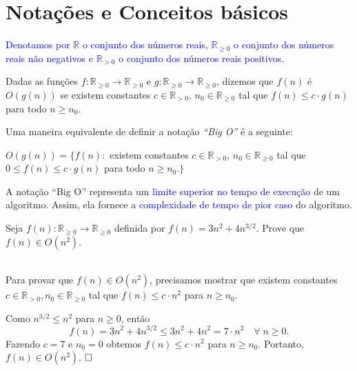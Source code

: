 \section{Notações e Conceitos básicos}
\textcolor{blue}{
Denotamos por
$\mathbb{R}$ o conjunto dos números reais, 
$\mathbb{R}_{\geq 0}$ o conjunto dos números reais não negativos e
$\mathbb{R}_{>0}$ o conjunto dos números reais positivos.
}
\begin{defn} 
Dadas as funções $f:\mathbb{R}_{\geq 0}\rightarrow \mathbb{R}_{\geq 0}$ e $g:\mathbb{R}_{\geq 0}\rightarrow \mathbb{R}_{\geq 0}$, dizemos que $f(n)$ é $O(g(n))$ se existem constantes $c\in\mathbb{R}_{>0}$, $n_0\in \mathbb{R}_{\geq 0}$ tal que $f(n) \leq c\cdot g(n)$  para todo $n \geq n_0$. 
\end{defn}
\vspace{0.2cm}

Uma maneira equivalente de definir a notação \textit{``Big O''} é a seguinte:\vspace{0.2cm}

\begin{defn}
$O(g(n)) = \{ f(n):$ existem constantes $c\in\mathbb{R}_{>0}$, $n_0\in \mathbb{R}_{\geq 0}$ tal que $0 \leq f(n) \leq c\cdot g(n)$ para todo $n \geq n_0.\}$
\end{defn}
\vspace{0.3cm}

A notação ``Big O'' representa um \textcolor{blue}{limite superior no tempo de execução} de um algoritmo.  Assim, ela fornece a \textcolor{blue}{complexidade de tempo de pior caso} do algoritmo.

\begin{exmp}%
Seja $f(n):\mathbb{R}_{\geq 0}\rightarrow \mathbb{R}_{\geq 0}$ definida por $f(n) = 3 n^2+ 4 n^{3/2}$. Prove que $f(n)\in O(n^2)$. 

 \\
Para provar que $f(n)\in O(n^2)$, precisamos mostrar que existem constantes $c\in \mathbb{R}_{>0},n_0 \in \mathbb{R}_{\geq 0}$ tal que $f(n) \leq c\cdot n^2$ para $n\geq n_0$.\vspace{0.3cm} 

Como $n^{3/2} \leq n^2$ para $n\geq 0$, então 
$$f(n)=3 n^2+ 4 n^{3/2} \leq 3 n^2 + 4 n^2 = 7\cdot n^2 \quad \forall\; n\geq 0.$$  
Fazendo $c=7$ e $n_0=0$ obtemos $f(n)\leq c\cdot n^2$ para $n\geq n_0$.  Portanto, $f(n)\in O(n^2)$.   
$\hfill\Box$
\end{exmp}

